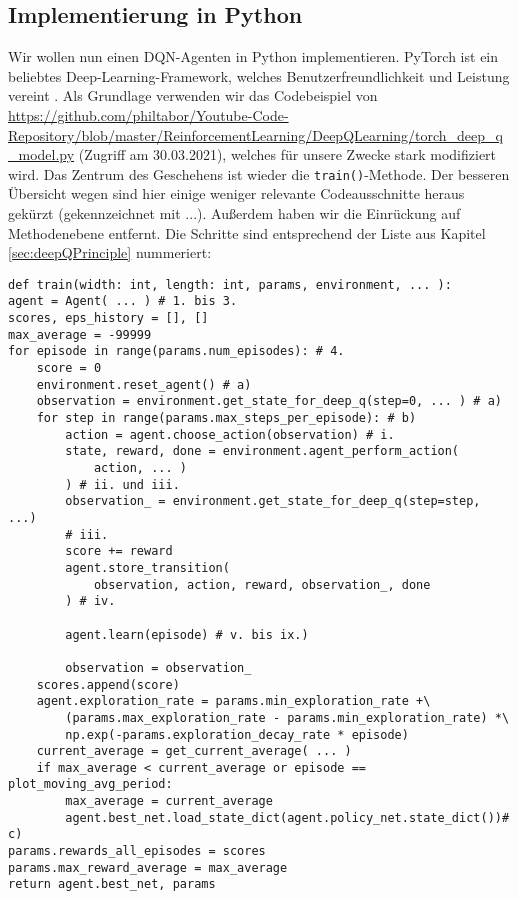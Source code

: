 \subsection{Implementierung in Python} \label{sec:deepQImplementation}
Wir wollen nun einen DQN-Agenten in Python implementieren. PyTorch ist ein beliebtes Deep-Learning-Framework, welches Benutzerfreundlichkeit und Leistung vereint \cite{x01_pytorch}. Als Grundlage verwenden wir das Codebeispiel von \url{https://github.com/philtabor/Youtube-Code-Repository/blob/master/ReinforcementLearning/DeepQLearning/torch_deep_q_model.py} (Zugriff am 30.03.2021), welches für unsere Zwecke stark modifiziert wird. Das Zentrum des Geschehens ist wieder die \texttt{train()}-Methode. Der besseren Übersicht wegen sind hier einige weniger relevante Codeausschnitte heraus gekürzt (gekennzeichnet mit ...). Außerdem haben wir die Einrückung auf Methodenebene entfernt. Die Schritte sind entsprechend der Liste aus Kapitel \ref{sec:deepQPrinciple} nummeriert:
\begin{verbatim}
def train(width: int, length: int, params, environment, ... ):
agent = Agent( ... ) # 1. bis 3.
scores, eps_history = [], []
max_average = -99999
for episode in range(params.num_episodes): # 4.
    score = 0
    environment.reset_agent() # a)
    observation = environment.get_state_for_deep_q(step=0, ... ) # a)
    for step in range(params.max_steps_per_episode): # b)
        action = agent.choose_action(observation) # i.
        state, reward, done = environment.agent_perform_action(
            action, ... )
        ) # ii. und iii.
        observation_ = environment.get_state_for_deep_q(step=step, ...)
        # iii.
        score += reward
        agent.store_transition(
            observation, action, reward, observation_, done
        ) # iv.

        agent.learn(episode) # v. bis ix.)

        observation = observation_
    scores.append(score)
    agent.exploration_rate = params.min_exploration_rate +\
        (params.max_exploration_rate - params.min_exploration_rate) *\
        np.exp(-params.exploration_decay_rate * episode)
    current_average = get_current_average( ... )
    if max_average < current_average or episode == plot_moving_avg_period:
        max_average = current_average
        agent.best_net.load_state_dict(agent.policy_net.state_dict())# c)
params.rewards_all_episodes = scores
params.max_reward_average = max_average
return agent.best_net, params
\end{verbatim}

